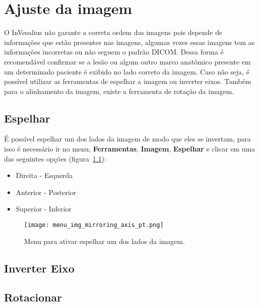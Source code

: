 \chapter{Ajuste da imagem}

O InVesalius não garante a correta ordem das imagens pois depende de informações que estão presentes nas imagens, algumas vezes essas imagens tem as informações incorretas ou não seguem o padrão DICOM. Dessa forma é recomendável confirmar se a lesão ou algum outro marco anatômico presente em um determinado paciente é exibido no lado correto da imagem. Caso não seja, é possível utilizar as ferramentas de espelhar a imagem ou inverter eixos. Também para o alinhamento da imagem, existe a ferramenta de rotação da imagem.

\section{Espelhar}

É possível espelhar um dos lados da imagem de modo que eles se invertam, para isso é necessário ir no menu, \textbf{Ferramentas}, \textbf{Imagem}, \textbf{Espelhar} e clicar em uma das seguintes opções (figura~\ref{fig:menu_img_mirroring_axis_pt}):

\begin{itemize}
	\item Direita - Esquerda
	\item Anterior - Posterior
	\item Superior - Inferior
\end{itemize}

\begin{figure}[!htb]
\centering
\texttt{[image: menu\_img\_mirroring\_axis\_pt.png]}
\caption{Menu para ativar espelhar um dos lados da imagem.}
\label{fig:menu_img_mirroring_axis_pt}
\end{figure}



\section{Inverter Eixo}

\section{Rotacionar} 